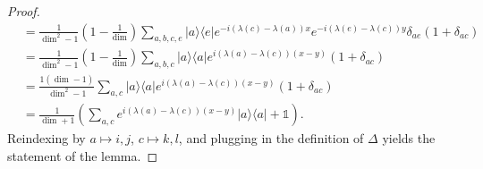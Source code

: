 \documentclass{article}
\newcommand{\ketbra}[2]{| #1\rangle\! \langle #2|}
\newcommand{\parens}[1]{\left( #1 \right)}
\newcommand{\identity}{\mathds{1}}
\begin{document}
\begin{proof}
\begin{align}
        &= \frac{1}{\dim^2 - 1} \parens{1 - \frac{1}{\dim}} \sum_{a, b, c, e} \ketbra{a}{e} e^{-i (\lambda(c) - \lambda(a))x} e^{-i (\lambda(e) - \lambda(c))y} \delta_{ae} (1 + \delta_{ac}) \\
        &= \frac{1}{\dim^2 - 1} \parens{1 - \frac{1}{\dim}} \sum_{a, b, c} \ketbra{a}{a} e^{i (\lambda(a) - \lambda(c))(x-y)} (1 + \delta_{ac}) \\
        &= \frac{1 \parens{\dim - 1}}{\dim^2 - 1} \sum_{a,c} \ketbra{a}{a} e^{i (\lambda(a) - \lambda(c))(x - y)} (1 + \delta_{ac}) \\
        &= \frac{1}{\dim + 1} \parens{\sum_{a,c} e^{i (\lambda(a) - \lambda(c))(x-y)} \ketbra{a}{a} + \identity}.
    \end{align}
    Reindexing by $a \mapsto i,j$, $c \mapsto k,l$, and plugging in the definition of $\Delta$ yields the statement of the lemma.
\end{proof}
\end{document}
